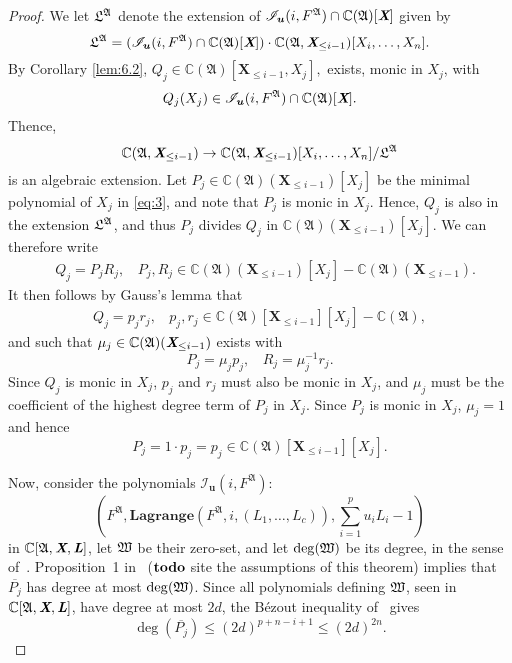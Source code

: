 \documentclass[a4paper]{article}
\def\A{\mathfrak{A}}
\def\Lb{\textit{\textbf{L}}}
\def\Xb{\textit{\textbf{X}}}
\def\ub{{\bm u}}
\def\pjb{\overline{P_{j}}}
\def\C{\mathbb{C}}
\def\lagFfA{{\bm{Lagrange}}(F^{\A},i,(L_1,\hdots,L_c))}
\def\IilfA{\mathscr{I}_{\ub}(i,F^{\A})}
\def\udl{\sum_{i=1}^pu_iL_i}
\def\td{{\bf todo}}
\begin{document}
\begin{proof}
     We let $\frak L^\A$ denote the extension of $\IilfA \cap \C(\A)[\Xb]$ given by 
  \[
  \frak
  L^\A =(\IilfA \cap \C(\A)[\Xb])\cdot \C(\frak A, \Xb_{\leq i-1})[X_i,\dots,X_n].
  \]
  By Corollary \ref{lem:6.2}, $Q_j\in\C(\A)[\textbf{X}_{\leq i-1},X_j],$ exists, monic in $X_j$, with 
    \[
    Q_j(X_j) \in \IilfA \cap \C(\A)[\Xb].
    \]
  Thence,
  \begin{equation}\label{eq:3}
    \C(\frak A, \Xb_{\leq i-1}) \to \C(\frak A,
    \Xb_{\leq i-1})[X_i,\dots,X_n]/\frak L^\A
  \end{equation}
    is an algebraic extension. Let $P_j \in \C(\A)(\textbf{X}_{\leq i-1})[X_j]$ 
be the minimal polynomial of $X_j$ in \eqref{eq:3}, and note that $P_j$ is monic in $X_j.$ 
    Hence, $Q_j$ is also in the extension $\frak{L}^\A$, and thus $P_j$ divides $Q_j$ in $\C(\A)(\textbf{X}_{\leq i-1})[X_j].$ We can therefore write 
    \begin{align*}
    &Q_j = P_jR_j,~~~~ P_j,R_j \in \C(\A)(\textbf{X}_{\leq i-1})[X_j]-\C(\A)(\textbf{X}_{\leq i-1}).
    \end{align*}
    It then follows by Gauss's lemma that 
    \begin{align*}
    Q_j = p_jr_j, ~~~~p_j,r_j \in \C(\A)[\textbf{X}_{\leq i-1}][X_j]-\C(\A),
    \end{align*}
    and such that $\mu_j \in \C(\A)(\Xb_{\leq i-1})$ exists with 
    \[
    P_j = \mu_j p_j,~~~~ R_j = \mu_j^{-1}r_j.
    \]
    Since $Q_j$ is monic in $X_j$, $p_j$ and $r_j$ must also be monic in $X_j$, and $\mu_j$ must be the coefficient of the highest degree term of $P_j$ in $X_j.$ Since $P_j$ is monic in $X_j$, $\mu_j =1$ and hence \[P_j=1\cdot p_j=p_j \in \C(\A)[\textbf{X}_{\leq i-1}][X_j].\]

  Now, consider the polynomials $\IilfA:$
\[
 \left(F^{\A}, \lagFfA,\udl-1 \right)
\]
in $\C[\A,\Xb,\Lb]$, let $\frak W$ be their zero-set, and let $\deg(\frak W)$ be its
  degree, in the sense of~\cite{H}. Proposition~1 in~\cite{CGR} ($\td$ site the assumptions of this theorem)
  implies that $\pjb$ has degree at most $\deg(\frak W)$. Since all
  polynomials defining $\frak W$, seen in $\C[\A,\Xb,\Lb]$, have
  degree at most $2d$, the B\'ezout inequality of~\cite{H} gives
  \[\deg(\pjb) \le (2d)^{p+n-i+1} \le (2d)^{2n}.\]
\end{proof}





\end{document}
